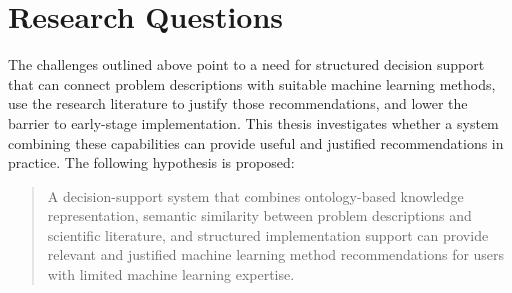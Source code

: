 
\section{Research Questions}

The challenges outlined above point to a need for structured 
decision support that can connect problem descriptions with 
suitable machine learning methods, use the research literature 
to justify those recommendations, and lower the barrier to 
early-stage implementation. This thesis investigates whether 
a system combining these capabilities can provide useful and 
justified recommendations in practice. The following hypothesis 
is proposed:


\begin{quote}
A decision-support system that combines ontology-based knowledge 
representation, semantic similarity between problem descriptions 
and scientific literature, and structured implementation support 
can provide relevant and justified machine learning method 
recommendations for users with limited machine learning expertise.
\end{quote}


